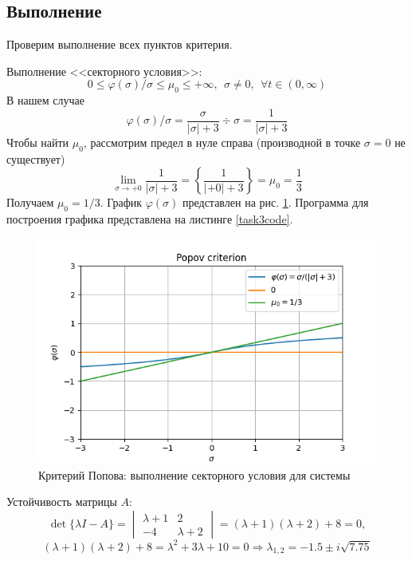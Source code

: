 \documentclass[a4paper, 12pt]{article}
\begin{document}
    \subsection{Выполнение}
    Проверим выполнение всех пунктов критерия.
    \begin{compactitem}
        \item Выполнение <<секторного условия>>: $$0\leq\varphi(\sigma)/\sigma\leq\mu_0\leq+\infty,\ \ \sigma\neq0,\ \ \forall t\in(0,\infty)$$
        В нашем случае
        $$\varphi(\sigma)/\sigma=\dfrac{\sigma}{|\sigma|+3}\div \sigma=\dfrac{1}{|\sigma|+3}$$
        Чтобы найти $\mu_0$, рассмотрим предел в нуле справа (производной в точке $\sigma=0$ не существует)
        $$\lim\limits_{\sigma\to+0}\dfrac{1}{|\sigma|+3}=\left\{\dfrac{1}{|+0|+3}\right\}=\mu_0=\dfrac{1}{3}$$
        Получаем $\mu_0=1/3$. График $\varphi(\sigma)$ представлен на рис. \ref{fig:task3}.
        Программа для построения графика представлена на листинге \ref{task3code}.
        \begin{figure}[H]
            \centering
            \includegraphics[scale=0.55]{task3.png}
            \captionsetup{skip=0pt}
            \caption{Критерий Попова: выполнение секторного условия для системы}
            \label{fig:task3}
        \end{figure}
        \item Устойчивость матрицы $A$:
        $$\det{\{\lambda I-A\}}=
        \begin{vmatrix}
            \lambda+1 & 2\\
            -4 & \lambda+2
        \end{vmatrix}=
        (\lambda+1)(\lambda+2)+8=0,$$
        $$(\lambda+1)(\lambda+2)+8=\lambda^2+3\lambda+10=0\Rightarrow\lambda_{1,2}=-1.5\pm i\sqrt{7.75}$$

\end{compactitem}
\end{document}
